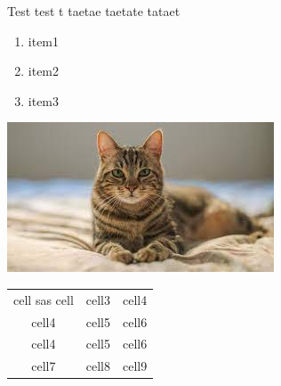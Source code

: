 \documentclass{report}
\begin{document}

    Test test t
    taetae 
    taetate \newline
    tataet

    \begin{enumerate}
        \item item1
        \item item2
        \item item3
    \end{enumerate}

    \includegraphics{../cat.jpg}

    \begin{tabular}{| c | c | c |}
    cell \newline sas cell & cell3 & cell4 \\
    cell4 & cell5 & cell6 \\
    cell4 & cell5 & cell6 \\
    cell7 & cell8 & cell9  
   \end{tabular}
\end{document}
